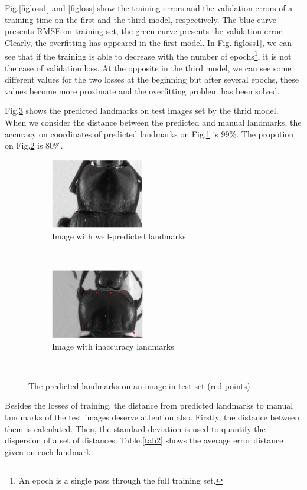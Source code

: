 \documentclass[review]{elsarticle}
\begin{document}
Fig.\ref{figloss1} and \ref{figloss} show the training errors and the validation errors of a training time on the first and the third model, respectively. The blue curve presents RMSE on training set, the green curve presents the validation error. Clearly, the overfitting has appeared in the first model. In Fig.\ref{figloss1}, we can see that if the training is able to decrease with the number of epochs\footnote{An epoch is a single pass through the full training set.}, it is not the case of validation loss. At the opposite in the third model, we can see some different values for the two losses at the beginning but after several epochs, these values become more proximate and the overfitting problem has been solved.

Fig.\ref{figrsexample} shows the predicted landmarks on test images set by the thrid model. When we consider the distance between the predicted and manual landmarks, the accuracy on coordinates of predicted landmarks on Fig.\ref{figsub1} is $99\%$. The propotion on Fig.\ref{figsub2} is $80\%$.

\begin{figure}[h]
    \centering
    \begin{subfigure}[t]{0.25\textwidth}
        \centering
        \includegraphics[height=1.2in]{images/plandmark}
        \caption{Image with well-predicted landmarks}
        \label{figsub1}
    \end{subfigure}%
    ~ 
    \begin{subfigure}[t]{0.25\textwidth}
        \centering
        \includegraphics[height=1.2in]{images/plandmark2}
        \caption{Image with inaccuracy landmarks}
        \label{figsub2}
    \end{subfigure}
    \caption{The predicted landmarks on an image in test set (red points)}\
    \label{figrsexample}
\end{figure}
Besides the losses of training, the distance from predicted landmarks to manual landmarks of the test images deserve attention also. Firstly, the distance between them is calculated. Then, the standard deviation \cite{bland1996statistics} is used to quantify the dispersion of a set of distances. Table.\ref{tab2} shows the average error distance given on each landmark.
\end{document}
